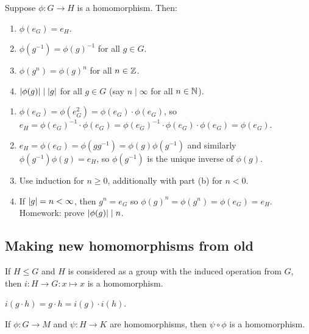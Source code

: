 \documentclass[12pt,letterpaper]{report}
\begin{document}
\begin{lem}{}{}
  Suppose $\phi \colon G \to H$ is a homomorphism.
  Then:
  \begin{enumerate}
    \item $\phi(e_G) = e_H$.
    \item $\phi(g^{-1}) = \phi(g)^{-1}$ for all $g \in G$.
    \item $\phi(g^n) = \phi(g)^n$ for all $n \in \mathbb{Z}$.
    \item $\lvert\phi(g)\rvert \mid \lvert g\rvert$ for all $g \in G$ (say $n \mid \infty$ for all
    $n \in \mathbb{N}$).
  \end{enumerate}
\end{lem}

\begin{thmproof}
  \begin{enumerate}
    \item
    $\phi(e_G) = \phi(e_G^2) = \phi(e_G) \cdot \phi(e_G)$, so
    $e_H = \phi(e_G)^{-1} \cdot \phi(e_G) = \phi(e_G)^{-1} \cdot \phi(e_G) \cdot \phi(e_G)
      = \phi(e_G)$.
    \item
    $e_H = \phi(e_G) = \phi(gg^{-1}) = \phi(g) \phi(g^{-1})$ and similarly
    $\phi(g^{-1}) \phi(g) = e_H$, so $\phi(g^{-1})$ is the unique inverse of $\phi(g)$.
    \item
    Use induction for $n \geq 0$, additionally with part (b) for $n < 0$.
    \item
    If $\lvert g\rvert = n < \infty$, then $g^n = e_G$ so $\phi(g)^n = \phi(g^n) = \phi(e_G) = e_H$.
    Homework: prove $\lvert\phi(g)\rvert \mid n$.
  \end{enumerate}
\end{thmproof}

\pagebreak
\subsection{Making new homomorphisms from old}

\begin{lem}{}{}
  If $H \leq G$ and $H$ is considered as a group with the induced operation from $G$, then
  $i \colon H \to G : x \mapsto x$ is a homomorphism.
\end{lem}

\begin{thmproof}
  $i(g \cdot h) = g \cdot h = i(g) \cdot i(h)$.
\end{thmproof}

\begin{lem}{}{}
  If $\phi \colon G \to M$ and $\psi \colon H \to K$ are homomorphisms, then $\psi \circ \phi$ is
  a homomorphism.
\end{lem}
\end{document}
